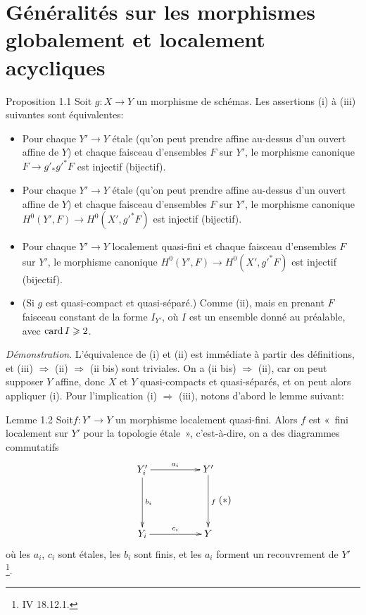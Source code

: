 \documentclass[10pt]{../fichiers-configuration-latex/smfart}
\begin{document}
\section{Généralités sur les morphismes globalement et localement
  acycliques}\pageoriginale


\begin{enonce*}{Proposition 1.1}
Soit $g:X\rightarrow Y$ un morphisme de schémas. Les assertions
{\rm(i)} à {\rm(iii)} suivantes sont équivalentes:
\begin{itemize}
\item[(i)] Pour chaque $Y'\rightarrow Y$ étale (qu'on peut prendre affine
  au-dessus d'un ouvert affine de $Y$) et chaque faisceau d'ensembles
  $F$ sur $Y'$, le morphisme canonique $F\rightarrow
  g'_{\ast}{g'}^{\ast}F$ est injectif (\resp bijectif).

\item[(ii)] Pour chaque $Y'\rightarrow Y$ étale (qu'on peut prendre affine
  au-dessus d'un ouvert affine de $Y$) et chaque faisceau d'ensembles
  $F$ sur $Y'$, le morphisme canonique $H^{0}(Y',F)\rightarrow
  H^{0}(X',{g'}^{\ast}F)$ est injectif (\resp bijectif).

\item[(iii)] Pour chaque $Y'\rightarrow Y$ localement quasi-fini et
  chaque faisceau d'ensembles $F$ sur $Y'$, le morphisme canonique
  $H^{0}(Y',F)\rightarrow H^{0}(X',{g'}^{\ast}F)$ est injectif
  (\resp bijectif).

\item[(ii bis)] (Si $g$ est quasi-compact et quasi-séparé.) Comme
  {\rm(ii)}, mais en prenant $F$ faisceau constant de la forme
  $I_{Y'}$, où $I$ est un ensemble donné au préalable, avec $\operatorname{card}
  I\geqslant 2$.
\end{itemize}
\end{enonce*}

\noindent
\emph{Démonstration}. L'équivalence de (i) et (ii) est immédiate à
partir des définitions, et (iii) $\Rightarrow$ (ii) $\Rightarrow$ (ii
bis) sont triviales. On a (ii bis) $\Rightarrow$ (ii), car on peut
supposer $Y$ affine, donc $X$ et $Y$ quasi-compacts et quasi-séparés,
et on peut alors appliquer  (i). Pour l'implication (i)
$\Rightarrow$ (iii), notons d'abord le lemme suivant:

\begin{enonce*}{Lemme 1.2}
Soit\pageoriginale $f:Y'\rightarrow Y$ un morphisme localement
quasi-fini. Alors $f$ est « fini localement sur $Y'$ pour la
topologie étale », c'est-à-dire, on a des diagrammes commutatifs
$$\vcenter{
\xymatrix@=1.75cm{
Y'_i        \ar[r]^{a_i}   \ar[d]^{b_i}& Y'\ar[d]^{f}\\
Y_i          \ar[r]^{c_i}              & Y
}}\leqno{(*)}
$$
où les $a_i$, $c_i$ sont étales, les $b_i$ sont finis, et les $a_i$
forment un recouvrement de $Y'$ \footnote[1]{\Cf \EGA IV 18.12.1.}.
\end{enonce*}
\end{document}
